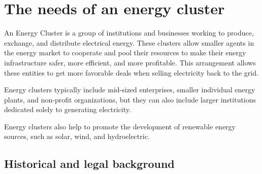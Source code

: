 \chapter{The needs of an energy cluster}
\label{ch:background}

\par An Energy Cluster is a group of institutions and businesses working to produce, exchange, and distribute electrical energy. These clusters allow smaller agents in the energy market to cooperate and pool their resources to make their energy infrastructure safer, more efficient, and more profitable. This arrangement allows these entities to get more favorable deals when selling electricity back to the grid. 
\par Energy clusters typically include mid-sized enterprises, smaller individual energy plants, and non-profit organizations, but they can also include larger institutions dedicated solely to generating electricity. 
\par Energy clusters also help to promote the development of renewable energy sources, such as solar, wind, and hydroelectric.

\section{Historical and legal background}


